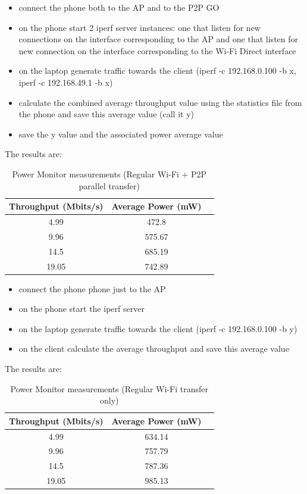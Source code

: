 \begin{itemize}
  \item connect the phone both to the AP and to the P2P GO
  \item on the phone start 2 iperf server instances: one that listen for new connections on the interface corresponding to the AP and one that listen for new connection on the interface corresponding to the Wi-Fi Direct interface
  \item on the laptop generate traffic towards the client (iperf -c 192.168.0.100 -b x, iperf -c 192.168.49.1 -b x)
  \item calculate the combined average throughput value using the statistics file from the phone and save this average value (call it y)
  \item save the y value and the associated power average value 
\end{itemize}

The results are:

\begin{table}[h!]
  \centering
  \caption{Power Monitor measurements (Regular Wi-Fi + P2P parallel transfer)}
  \label{tab:table1}
  \begin{tabular}{ccc}
    \toprule
    Throughput (Mbits/s) & Average Power (mW) \\
    \midrule
     4.99 & 472.8 \\
     9.96 & 575.67 \\
     14.5 & 685.19\\
     19.05 & 742.89 \\
    \bottomrule
  \end{tabular}
\end{table}

\begin{itemize}
  \item connect the phone phone just to the AP
  \item on the phone start the iperf server
  \item on the laptop generate traffic towards the client (iperf -c 192.168.0.100 -b y)
  \item on the client calculate the average throughput and save this average value
\end{itemize}

The results are:

\begin{table}[h!]
  \centering
  \caption{Power Monitor measurements (Regular Wi-Fi transfer only)}
  \label{tab:table1}
  \begin{tabular}{ccc}
    \toprule
    Throughput (Mbits/s) & Average Power (mW) \\
    \midrule
     4.99 & 634.14 \\
     9.96 & 757.79 \\
     14.5 & 787.36 \\
     19.05 & 985.13 \\
    \bottomrule
  \end{tabular}
\end{table}

